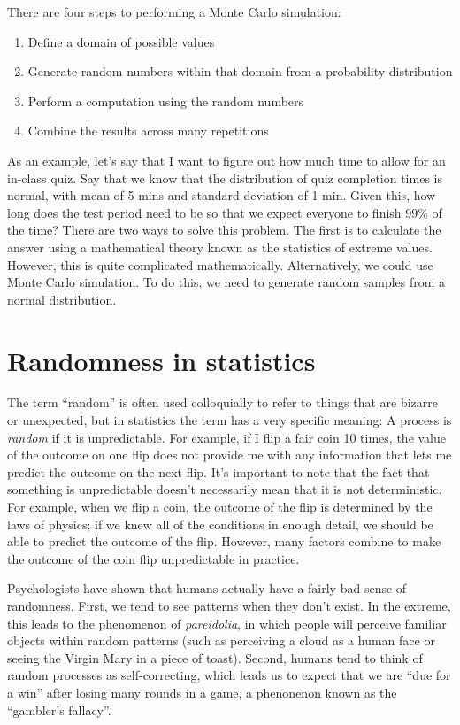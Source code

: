 \documentclass[]{book}
\providecommand{\tightlist}{%
  \setlength{\itemsep}{0pt}\setlength{\parskip}{0pt}}
\theoremstyle{definition}
\theoremstyle{definition}
\theoremstyle{definition}
\theoremstyle{remark}
\begin{document}
There are four steps to performing a Monte Carlo simulation:

\begin{enumerate}
\def\labelenumi{\arabic{enumi}.}
\tightlist
\item
  Define a domain of possible values
\item
  Generate random numbers within that domain from a probability
  distribution
\item
  Perform a computation using the random numbers
\item
  Combine the results across many repetitions
\end{enumerate}

As an example, let's say that I want to figure out how much time to
allow for an in-class quiz. Say that we know that the distribution of
quiz completion times is normal, with mean of 5 mins and standard
deviation of 1 min. Given this, how long does the test period need to be
so that we expect everyone to finish 99\% of the time? There are two
ways to solve this problem. The first is to calculate the answer using a
mathematical theory known as the statistics of extreme values. However,
this is quite complicated mathematically. Alternatively, we could use
Monte Carlo simulation. To do this, we need to generate random samples
from a normal distribution.

\section{Randomness in statistics}\label{randomness-in-statistics}

The term ``random'' is often used colloquially to refer to things that
are bizarre or unexpected, but in statistics the term has a very
specific meaning: A process is \emph{random} if it is unpredictable. For
example, if I flip a fair coin 10 times, the value of the outcome on one
flip does not provide me with any information that lets me predict the
outcome on the next flip. It's important to note that the fact that
something is unpredictable doesn't necessarily mean that it is not
deterministic. For example, when we flip a coin, the outcome of the flip
is determined by the laws of physics; if we knew all of the conditions
in enough detail, we should be able to predict the outcome of the flip.
However, many factors combine to make the outcome of the coin flip
unpredictable in practice.

Psychologists have shown that humans actually have a fairly bad sense of
randomness. First, we tend to see patterns when they don't exist. In the
extreme, this leads to the phenomenon of \emph{pareidolia}, in which
people will perceive familiar objects within random patterns (such as
perceiving a cloud as a human face or seeing the Virgin Mary in a piece
of toast). Second, humans tend to think of random processes as
self-correcting, which leads us to expect that we are ``due for a win''
after losing many rounds in a game, a phenonenon known as the
``gambler's fallacy''.
\end{document}
